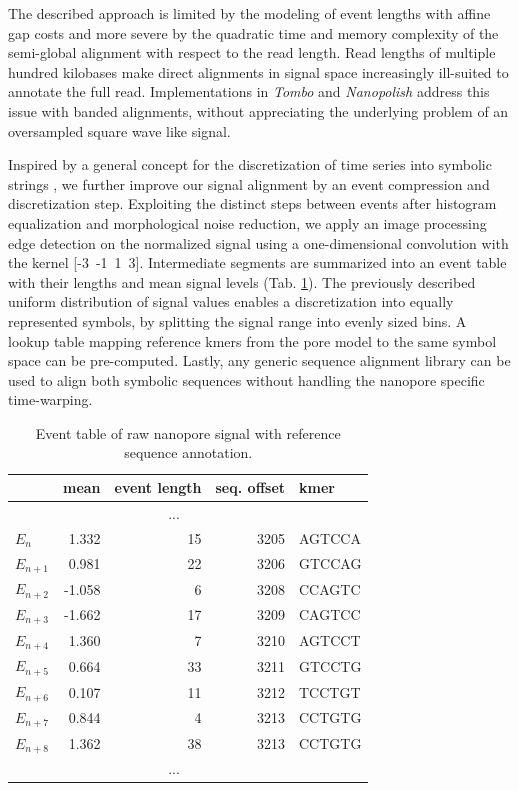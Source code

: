 The described approach is limited by the modeling of event lengths with affine gap costs and more severe by the quadratic time and memory complexity of the semi-global alignment with respect to the read length. 
Read lengths of multiple hundred kilobases make direct alignments in signal space increasingly ill-suited to annotate the full read. 
Implementations in \textit{Tombo} and \textit{Nanopolish} \cite{Simpson2017, Gamaarachchi2020} address this issue with banded alignments, without appreciating the underlying problem of an oversampled square wave like signal.

Inspired by a general concept for the discretization of time series into symbolic strings \cite{Lin2003}, we further improve our signal alignment by an event compression and discretization step. Exploiting the distinct steps between events after histogram equalization and morphological noise reduction, we apply an image processing edge detection on the normalized signal using a one-dimensional convolution with the kernel [-3\ -1\ 1\ 3]. 
Intermediate segments are summarized into an event table with their lengths and mean signal levels (Tab. \ref{tab:signal:events}). 
The previously described uniform distribution of signal values enables a discretization into equally represented symbols, by splitting the signal range into evenly sized bins. 
A lookup table mapping reference kmers from the pore model to the same symbol space can be pre-computed. 
Lastly, any generic sequence alignment library can be used to align both symbolic sequences without handling the nanopore specific time-warping.


\begin{table}[ht]
	\centering
	\caption[Event detection and annotation]{Event table of raw nanopore signal with reference sequence annotation.}
	\label{tab:signal:events}
	\begin{tabular}{l|r|r|r|l}
		& mean & event length & seq. offset & kmer \\
		\hline 
		& \multicolumn{3}{c|}{...} &  \\
		\hline
		$ E_{n} $ &  1.332  & 15 & 3205 & AGTCCA \\
		\rowcolor{LightOrange}
		$ E_{n+1} $ &  0.981  & 22 & 3206 & GTCCAG \\
		$ E_{n+2} $ & -1.058  &  6 & 3208 & CCAGTC \\
		$ E_{n+3} $ & -1.662  & 17 & 3209 & CAGTCC \\
		$ E_{n+4} $ &  1.360  &  7 & 3210 & AGTCCT \\
		$ E_{n+5} $ &  0.664  & 33 & 3211 & GTCCTG \\
		$ E_{n+6} $ &  0.107  & 11 & 3212 & TCCTGT \\
		\rowcolor{LightGreen}
		$ E_{n+7} $ &  0.844  &  4 & 3213 & CCTGTG \\
		\rowcolor{LightGreen}
		$ E_{n+8} $ &  1.362  & 38 & 3213 & CCTGTG \\
		\hline
		& \multicolumn{3}{c|}{...} &  \\
	\end{tabular} 
\end{table}


